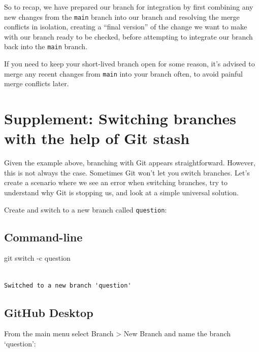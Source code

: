 \documentclass[
  letterpaper,
  DIV=11,
  numbers=noendperiod]{scrartcl}
\newenvironment{Shaded}{\begin{snugshade}}{\end{snugshade}}
\newcommand{\AttributeTok}[1]{\textcolor[rgb]{0.40,0.45,0.13}{#1}}
\newcommand{\FunctionTok}[1]{\textcolor[rgb]{0.28,0.35,0.67}{#1}}
\newcommand{\NormalTok}[1]{\textcolor[rgb]{0.00,0.23,0.31}{#1}}
\begin{document}
So to recap, we have prepared our branch for integration by first
combining any new changes from the \texttt{main} branch into our branch
and resolving the merge conflicts in isolation, creating a ``final
version'' of the change we want to make with our branch ready to be
checked, before attempting to integrate our branch back into the
\texttt{main} branch.

If you need to keep your short-lived branch open for some reason, it's
advised to merge any recent changes from \texttt{main} into your branch
often, to avoid painful merge conflicts later.

\hypertarget{supplement-switching-branches-with-the-help-of-git-stash}{%
\section{Supplement: Switching branches with the help of Git
stash}\label{supplement-switching-branches-with-the-help-of-git-stash}}

Given the example above, branching with Git appears straightforward.
However, this is not always the case. Sometimes Git won't let you switch
branches. Let's create a scenario where we see an error when switching
branches, try to understand why Git is stopping us, and look at a simple
universal solution.

Create and switch to a new branch called \texttt{question}:

\subsection{Command-line}

\begin{Shaded}
\begin{Highlighting}[]
\FunctionTok{git}\NormalTok{ switch }\AttributeTok{{-}c}\NormalTok{ question}
\end{Highlighting}
\end{Shaded}

\begin{verbatim}

Switched to a new branch 'question'
\end{verbatim}

\subsection{GitHub Desktop}

From the main menu select Branch \textgreater{} New Branch and name the
branch `question':
\end{document}
